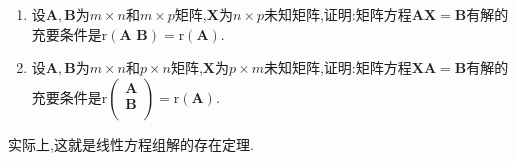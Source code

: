 \documentclass[../../main.tex]{subfiles}%
\begin{document}
\begin{theorem}[线性方程组有解的充要条件]\label{theorem:线性方程组有解的充要条件}
\begin{enumerate}
\item 设\(\boldsymbol{A},\boldsymbol{B}\)为\(m\times n\)和\(m\times p\)矩阵,\(\boldsymbol{X}\)为\(n\times p\)未知矩阵,证明:矩阵方程\(\boldsymbol{A}\boldsymbol{X}=\boldsymbol{B}\)有解的充要条件是\(\mathrm{r}\left( \boldsymbol{A}\,\,\boldsymbol{B} \right)=\mathrm{r}(\boldsymbol{A})\).

\item 设\(\boldsymbol{A},\boldsymbol{B}\)为\(m\times n\)和\(p\times n\)矩阵,\(\boldsymbol{X}\)为\(p\times m\)未知矩阵,证明:矩阵方程\(\boldsymbol{X}\boldsymbol{A}=\boldsymbol{B}\)有解的充要条件是\(\mathrm{r}\left( \begin{array}{c}
\boldsymbol{A}\\
\boldsymbol{B}\\
\end{array} \right) =\mathrm{r}\left( \boldsymbol{A} \right) \).
\end{enumerate}
\end{theorem}
\begin{note}
实际上,这就是线性方程组解的存在定理.
\end{note}
\end{document}
